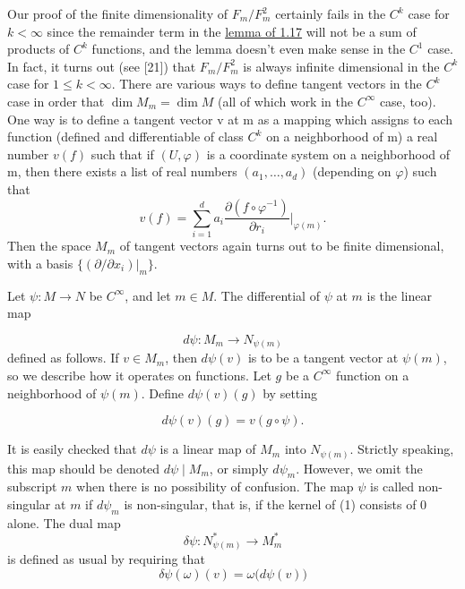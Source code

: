 \label{thm:1.21}
Our proof of the finite dimensionality of $F_m/F_m^2$ certainly fails in the  $ C^k $ case for  $ k < \infty $ since the remainder term in the \hyperref[thm:1.17]{lemma of 1.17} will not be a sum of products of  $ C^k $ functions, and the lemma doesn't even make sense in the  $ C^1 $ case. In fact, it turns out (see [21]) that $F_m/F_m^2$ is always infinite dimensional in the  $ C^k $ case for  $ 1 \leq k < \infty $. There are various ways to define tangent vectors in the  $ C^k $ case in order that  $ \dim M_m = \dim M $ (all of which work in the  $ C^\infty $ case, too). One way is to define a tangent vector v at m as a mapping which assigns to each function (defined and differentiable of class  $ C^k $ on a neighborhood of m) a real number  $ v(f) $ such that if  $ (U, \varphi) $ is a coordinate system on a neighborhood of m, then there exists a list of real numbers  $ (a_1, \ldots, a_d) $ (depending on  $ \varphi $) such that
\[
	v(f)=\sum_{i=1}^{d}a_{i}\frac{\partial(f\circ\varphi^{-1})}{\partial r_{i}}\bigg|_{\varphi(m)}.
\]
Then the space  $ M_m $ of tangent vectors again turns out to be finite dimensional, with a basis  $ \{(\partial/\partial x_i)\big|_{m}\} $.

\label{thm:1.22}
Let  $ \psi: M \to N $ be  $ C^\infty $, and let  $ m \in M $. The differential of  $ \psi $ at  $ m $ is the linear map

\begin{equation}
	\label{eq:1.22:1}
	d\psi\colon M_{m}\to N_{\psi(m)}
\end{equation}
defined as follows. If $v\in M_{m}$, then $d\psi(v)$ is to be a tangent vector at $\psi(m)$, so we describe how it operates on functions.
Let $g$ be a $C^{\infty}$ function on a neighborhood of $\psi(m)$. Define $d\psi(v)(g)$ by setting

\begin{equation}
	\label{eq:1.22:2}
	d\psi(v)(g)=v(g\circ\psi).
\end{equation}

It is easily checked that $d\psi$ is a linear map of $M_{m}$ into $N_{\psi(m)}$. Strictly speaking, this map should be
denoted $d\psi\mid M_{m}$, or simply $d\psi_{m}$. However, we omit the subscript $m$ when there is no
possibility of confusion. The map $\psi$ is called non-singular at $m$ if $d\psi_{m}$ is non-singular,
that is, if the kernel of (1) consists of 0 alone. The dual map 
\begin{equation}
	\label{eq:1.22:3}
	\delta\psi\colon N_{\psi(m)}^{*}\to M_{m}^{*}
\end{equation}
is defined as usual by requiring that
\begin{equation}
	\label{eq:1.22:4}
	\delta\psi(\omega)(v)=\omega\bigl(d\psi(v)\bigr)
\end{equation}

